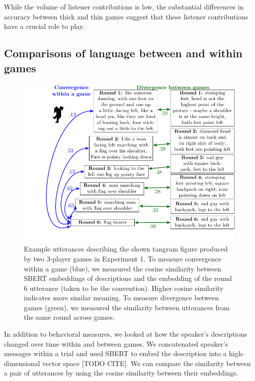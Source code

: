 \documentclass[
  english,
  a4paper,
]{article}
\begin{document}
While the volume of listener contributions is low, the substantial differences in accuracy between thick and thin games suggest that these listener contributions have a crucial role to play.

\hypertarget{comparisons-of-language-between-and-within-games}{%
\subsection{Comparisons of language between and within games}\label{comparisons-of-language-between-and-within-games}}

\begin{figure}[t!]

{\centering \includegraphics[width=1\linewidth]{sbert} 

}

\caption{Example utterances describing the shown tangram figure produced by two 3-player games in Experiment 1. To measure convergence within a game (blue), we measured the cosine similarity between SBERT embeddings of descriptions and the embedding of the round 6 utterance (taken to be the convention). Higher cosine similarity indicates more similar meaning. To measure divergence between games (green), we measured the similarity between utterances from the same round across games.}\label{fig:sbert-diagram}
\end{figure}

In addition to behavioral measures, we looked at how the speaker's descriptions changed over time within and between games. We concatenated speaker's messages within a trial and used SBERT to embed the description into a high-dimensional vector space {[}TODO CITE{]}. We can compare the similarity between a pair of utterances by using the cosine similarity between their embeddings.
\end{document}
